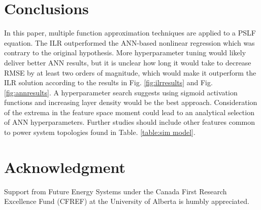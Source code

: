 \documentclass[conference]{IEEEtran}
\begin{document}
\section{Conclusions}
\label{sec:conc}
In this paper, multiple function approximation techniques are applied to a PSLF equation. The ILR outperformed the ANN-based nonlinear regression which was contrary to the original hypothesis. More hyperparameter tuning would likely deliver better ANN results, but it is unclear how long it would take to decrease RMSE by at least two orders of magnitude, which would make it outperform the ILR solution according to the results in Fig. \ref{fig:ilrresults} and Fig. \ref{fig:annresults}. A hyperparameter search suggests using sigmoid activation functions and increasing layer density would be the best approach. Consideration of the extrema in the feature space moment could lead to an analytical selection of ANN hyperparameters. Further studies should include other features common to power system topologies found in Table. \ref{table:sim model}.

\section*{Acknowledgment}
Support from Future Energy Systems under the Canada First Research Excellence Fund (CFREF) at the University of Alberta is humbly appreciated.




\end{document}
